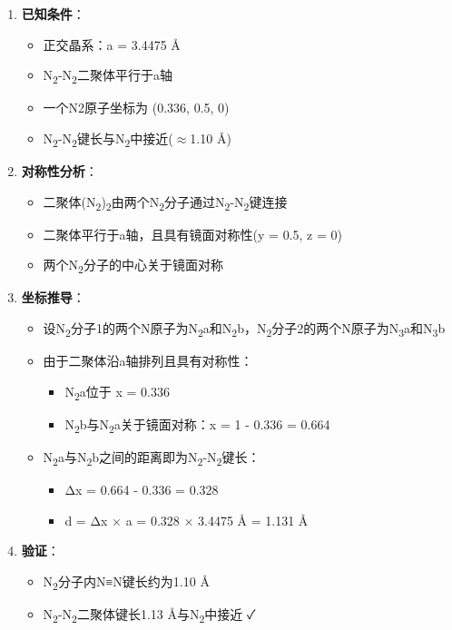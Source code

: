 \documentclass[a4paper,11pt]{ctexart}
\providecommand{\tightlist}{\setlength{\itemsep}{0pt}\setlength{\parskip}{0pt}}
\newcommand{\箭}{\ensuremath{\rightarrow}}
\newcommand{\左箭}{\ensuremath{\leftarrow}}
\newcommand{\上箭}{\ensuremath{\uparrow}}
\newcommand{\下箭}{\ensuremath{\downarrow}}
\newcommand{\衡}{\ensuremath{\rightleftharpoons}}
\newcommand{\双箭}{\ensuremath{\leftrightarrow}}
\newcommand{\约等于}{\ensuremath{\approx}}
\newcommand{\小于等于}{\ensuremath{\leq}}
\newcommand{\大于等于}{\ensuremath{\geq}}
\newcommand{\不等于}{\ensuremath{\neq}}
\newcommand{\西格马}{\ensuremath{\sigma}}
\newcommand{\派}{\ensuremath{\pi}}
\begin{document}
\begin{enumerate}
\def\labelenumi{\arabic{enumi}.}
\tightlist
\item
  \textbf{已知条件}：

  \begin{itemize}
  \tightlist
  \item
    正交晶系：a = 3.4475 Å
  \item
    N\textsubscript{2}-N\textsubscript{2}二聚体平行于a轴
  \item
    一个N2原子坐标为 (0.336, 0.5, 0)
  \item
    N\textsubscript{2}-N\textsubscript{2}键长与N\textsubscript{2}中接近(\约等于1.10 Å)
  \end{itemize}
\item
  \textbf{对称性分析}：

  \begin{itemize}
  \tightlist
  \item
    二聚体(N\textsubscript{2})\textsubscript{2}由两个N\textsubscript{2}分子通过N\textsubscript{2}-N\textsubscript{2}键连接
  \item
    二聚体平行于a轴，且具有镜面对称性(y = 0.5, z = 0)
  \item
    两个N\textsubscript{2}分子的中心关于镜面对称
  \end{itemize}
\item
  \textbf{坐标推导}：

  \begin{itemize}
  \tightlist
  \item
    设N\textsubscript{2}分子1的两个N原子为N\textsubscript{2}a和N\textsubscript{2}b，N\textsubscript{2}分子2的两个N原子为N\textsubscript{3}a和N\textsubscript{3}b
  \item
    由于二聚体沿a轴排列且具有对称性：

    \begin{itemize}
    \tightlist
    \item
      N\textsubscript{2}a位于 x = 0.336
    \item
      N\textsubscript{2}b与N\textsubscript{2}a关于镜面对称：x = 1 - 0.336 = 0.664
    \end{itemize}
  \item
    N\textsubscript{2}a与N\textsubscript{2}b之间的距离即为N\textsubscript{2}-N\textsubscript{2}键长：

    \begin{itemize}
    \tightlist
    \item
      Δx = 0.664 - 0.336 = 0.328
    \item
      d = Δx × a = 0.328 × 3.4475 Å = 1.131 Å
    \end{itemize}
  \end{itemize}
\item
  \textbf{验证}：

  \begin{itemize}
  \tightlist
  \item
    N\textsubscript{2}分子内N≡N键长约为1.10 Å
  \item
    N\textsubscript{2}-N\textsubscript{2}二聚体键长1.13 Å与N\textsubscript{2}中接近 ✓
  \end{itemize}
\end{enumerate}
\end{document}
